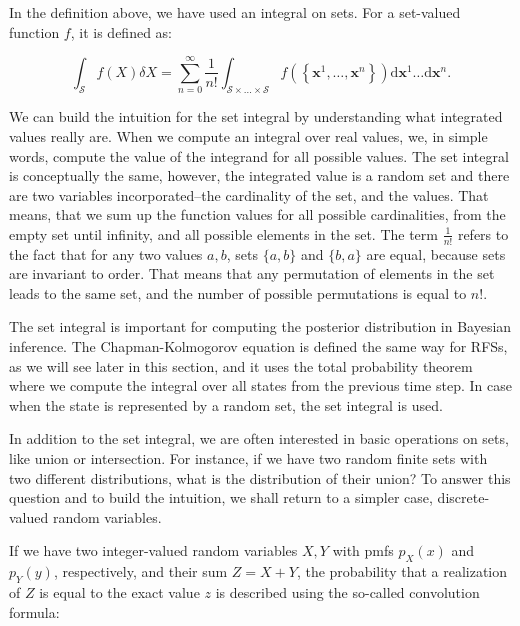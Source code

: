 In the definition above, we have used an integral on sets. For a set-valued function $f$, it is defined as:

\begin{equation}\label{eq:set-integral}
    \int_\mathcal{S} f(X) \delta X =
        \sum_{n=0}^{\infty} \frac{1}{n !}
        \int_{\mathcal{S} \times \ldots \times \mathcal{S}}
            f\left(\left\{\mathbf{x}^1, \ldots, \mathbf{x}^n\right\}\right) \mathrm{d} \mathbf{x}^1 \ldots \mathrm{d} \mathbf{x}^n.
\end{equation}

We can build the intuition for the set integral by understanding what integrated values really are. When we compute an integral over real values, we, in simple words, compute the value of the integrand for all possible values. The set integral is conceptually the same, however, the integrated value is a random set and there are two variables incorporated--the cardinality of the set, and the values. That means, that we sum up the function values for all possible cardinalities, from the empty set until infinity, and all possible elements in the set. The term $\frac{1}{n !}$ refers to the fact that for any two values $a, b$, sets $\{a, b\}$ and $\{b, a\}$ are equal, because sets are invariant to order. That means that any permutation of elements in the set leads to the same set, and the number of possible permutations is equal to $n!$.

The set integral is important for computing the posterior distribution in Bayesian inference. The Chapman-Kolmogorov equation is defined the same way for RFSs, as we will see later in this section, and it uses the total probability theorem where we compute the integral over all states from the previous time step. In case when the state is represented by a random set, the set integral is used.

In addition to the set integral, we are often interested in basic operations on sets, like union or intersection. For instance, if we have two random finite sets with two different distributions, what is the distribution of their union? To answer this question and to build the intuition, we shall return to a simpler case, discrete-valued random variables.

If we have two integer-valued random variables $X, Y$ with pmfs $p_X(x)$ and $p_Y(y)$, respectively, and their sum $Z = X + Y$, the probability that a realization of $Z$ is equal to the exact value $z$ is described using the so-called convolution formula:

